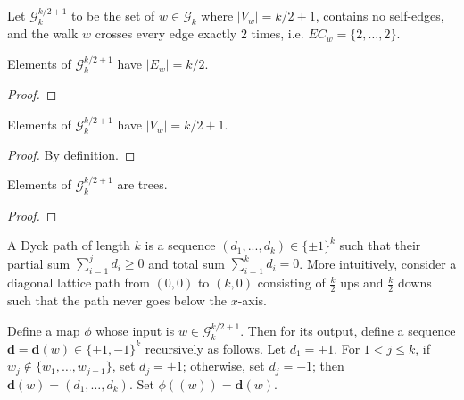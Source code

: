 \begin{definition}
  \label{def:special_set_g}
  Let $\mathcal{G}^{k/2+1}_k$ to be the set of $w\in\mathcal{G}_k$ where $|V_w|=k/2+1$,
  contains no self-edges, and the walk $w$ crosses every edge exactly $2$ times, i.e.
  $EC_w =\{2, \dots, 2\}$.
\end{definition}


\begin{lemma}
  \label{lem:special_g_edge_count}
  Elements of $\mathcal{G}_k^{k/2+1}$ have $|E_w| = k/2$.
\end{lemma}

\begin{proof}
\end{proof}


\begin{lemma}
  \label{lem:special_g_vertex_count}
  Elements of $\mathcal{G}_k^{k/2+1}$ have $|V_w| = k/2 + 1$.
\end{lemma}

\begin{proof}
  By definition.
\end{proof}


\begin{lemma}
  \label{lem:special_g_tree}
  Elements of $\mathcal{G}_k^{k/2+1}$ are trees.
\end{lemma}

\begin{proof}
\end{proof}


\begin{definition}
  \notready
  \label{def:Dyck_paths}
  A Dyck path of length $k$ is a sequence $(d_1,...,d_k) \in \{\pm 1\}^k$ such that their partial sum $\sum_{i=1}^j d_i \geq 0$
  and total sum $\sum_{i = 1}^{k}d_i = 0$. More intuitively, consider a diagonal lattice path from $(0,0)$ to $(k, 0)$ consisting of
  $\frac{k}{2}$ ups and $\frac{k}{2}$ downs such that the path never goes below the $x$-axis.
\end{definition}


\begin{definition}
  \notready
  \label{def:graph_to_Dyck_map}
   Define a map $\phi$ whose input is $w \in \mathcal{G}^{k/2 + 1}_k$. Then for its output,
   define a sequence $\mathbf{d}=\mathbf{d}(w)\in\{+1,-1\}^k$ recursively as follows.
   Let $d_1=+1$.  For $1<j\le k$, if $w_j\notin\{w_1,\ldots,w_{j-1}\}$, set $d_j=+1$; otherwise, set $d_j=-1$; then
   $\mathbf{d}(w) = (d_1,\ldots,d_k)$. Set $\phi((w)) = \mathbf{d}(w)$.
\end{definition}


